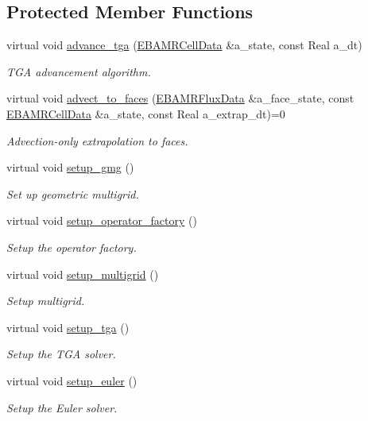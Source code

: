 \subsection*{Protected Member Functions}
\begin{DoxyCompactItemize}
\item 
virtual void \hyperlink{classcdr__tga_ac1f05bcf1db47887d54f2c8c8a7592cc}{advance\+\_\+tga} (\hyperlink{type__definitions_8H_a7e610f301989e5e07781c5e338bdb7c3}{E\+B\+A\+M\+R\+Cell\+Data} \&a\+\_\+state, const Real a\+\_\+dt)
\begin{DoxyCompactList}\small\item\em T\+GA advancement algorithm. \end{DoxyCompactList}\item 
virtual void \hyperlink{classcdr__tga_a49e99cea18c3ab9c69bf698ceb60b63c}{advect\+\_\+to\+\_\+faces} (\hyperlink{type__definitions_8H_aadad278b2e5d3d4abcf9032f90ba78c3}{E\+B\+A\+M\+R\+Flux\+Data} \&a\+\_\+face\+\_\+state, const \hyperlink{type__definitions_8H_a7e610f301989e5e07781c5e338bdb7c3}{E\+B\+A\+M\+R\+Cell\+Data} \&a\+\_\+state, const Real a\+\_\+extrap\+\_\+dt)=0
\begin{DoxyCompactList}\small\item\em Advection-\/only extrapolation to faces. \end{DoxyCompactList}\item 
virtual void \hyperlink{classcdr__tga_a4d0d6d79bad0c3e1c0efe07ce65fbe05}{setup\+\_\+gmg} ()
\begin{DoxyCompactList}\small\item\em Set up geometric multigrid. \end{DoxyCompactList}\item 
virtual void \hyperlink{classcdr__tga_a85c2196844e645e3410dfd8bd10d013a}{setup\+\_\+operator\+\_\+factory} ()
\begin{DoxyCompactList}\small\item\em Setup the operator factory. \end{DoxyCompactList}\item 
virtual void \hyperlink{classcdr__tga_a5b80c4ebc165f095a3e373bd88fce814}{setup\+\_\+multigrid} ()
\begin{DoxyCompactList}\small\item\em Setup multigrid. \end{DoxyCompactList}\item 
virtual void \hyperlink{classcdr__tga_a5bdc0921edc82101d99be29945aa89a9}{setup\+\_\+tga} ()
\begin{DoxyCompactList}\small\item\em Setup the T\+GA solver. \end{DoxyCompactList}\item 
virtual void \hyperlink{classcdr__tga_a8c68cec8e9c75ef90e0b745bde1b82f8}{setup\+\_\+euler} ()
\begin{DoxyCompactList}\small\item\em Setup the Euler solver. \end{DoxyCompactList}\end{DoxyCompactItemize}

